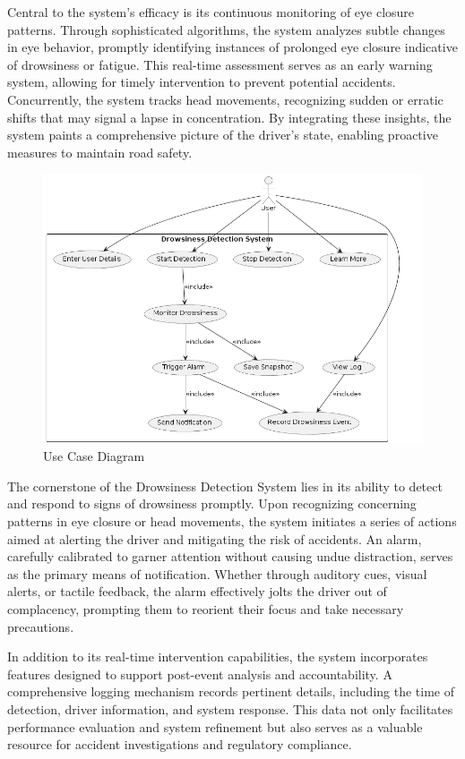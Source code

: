 \documentclass[12pt]{article}
\begin{document}
Central to the system's efficacy is its continuous monitoring of eye closure patterns. Through sophisticated algorithms, the system analyzes subtle changes in eye behavior, promptly identifying instances of prolonged eye closure indicative of drowsiness or fatigue. This real-time assessment serves as an early warning system, allowing for timely intervention to prevent potential accidents. Concurrently, the system tracks head movements, recognizing sudden or erratic shifts that may signal a lapse in concentration. By integrating these insights, the system paints a comprehensive picture of the driver's state, enabling proactive measures to maintain road safety.
\begin{figure}[h]
\centering
\includegraphics[width=1.0\textwidth]{use}
\caption{Use Case Diagram}
\end{figure}
\FloatBarrier

The cornerstone of the Drowsiness Detection System lies in its ability to detect and respond to signs of drowsiness promptly. Upon recognizing concerning patterns in eye closure or head movements, the system initiates a series of actions aimed at alerting the driver and mitigating the risk of accidents. An alarm, carefully calibrated to garner attention without causing undue distraction, serves as the primary means of notification. Whether through auditory cues, visual alerts, or tactile feedback, the alarm effectively jolts the driver out of complacency, prompting them to reorient their focus and take necessary precautions.

In addition to its real-time intervention capabilities, the system incorporates features designed to support post-event analysis and accountability. A comprehensive logging mechanism records pertinent details, including the time of detection, driver information, and system response. This data not only facilitates performance evaluation and system refinement but also serves as a valuable resource for accident investigations and regulatory compliance.
\end{document}
